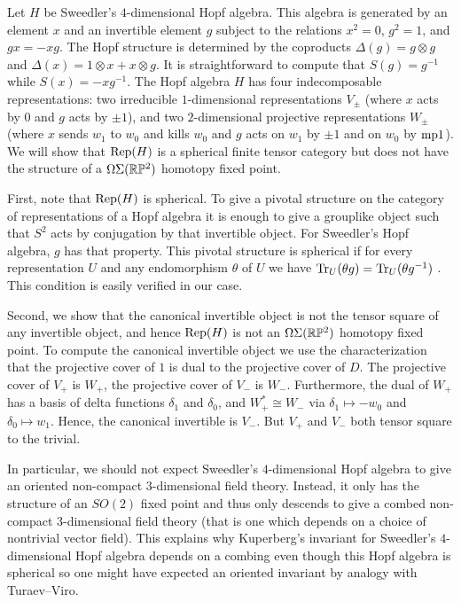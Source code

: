 \documentclass{amsart}
\begin{document}
\begin{example}
Let $H$ be Sweedler's $4$-dimensional Hopf algebra.  This algebra is generated by an element $x$ and an invertible element $g$ subject to the relations $x^2 = 0$, $g^2 = 1$, and $gx = -xg$.  The Hopf structure is determined by the coproducts $\Delta(g) = g \otimes g$ and $\Delta(x) = 1 \otimes x + x \otimes g$.  It is straightforward to compute that $S(g) = g^{-1}$ while $S(x) = - x g^{-1}$.  The Hopf algebra $H$ has four indecomposable representations: two irreducible $1$-dimensional representations $V_{\pm}$ (where $x$ acts by $0$ and $g$ acts by $\pm 1$), and two $2$-dimensional projective representations $W_\pm$ (where $x$ sends $w_1$ to $w_0$ and kills $w_0$ and $g$ acts on $w_1$ by $\pm 1$ and on $w_0$ by $\minusplus 1$). We will show that $\mathrm{Rep}(H)$ is a spherical finite tensor category but does not have the structure of a $\Omega \Sigma (\mathbb R \mathbb P^2)$ homotopy fixed point.

First, note that $\mathrm{Rep}(H)$ is spherical.  To give a pivotal structure on the category of representations of a Hopf algebra it is enough to give a grouplike object such that $S^2$ acts by conjugation by that invertible object.  For Sweedler's Hopf algebra, $g$ has that property.  This pivotal structure is spherical if for every representation $U$ and any endomorphism $\theta$ of $U$ we have $\mathrm{Tr}_U(\theta g) = \mathrm{Tr}_U(\theta g^{-1})$ \cite{MR1686423}.  This condition is easily verified in our case.

Second, we show that the canonical invertible object is not the tensor square of any invertible object, and hence $\mathrm{Rep}(H)$ is not an $\Omega \Sigma (\mathbb R \mathbb P^2)$ homotopy fixed point.  To compute the canonical invertible object we use the characterization that the projective cover of $1$ is dual to the projective cover of $D$.  The projective cover of $V_+$ is $W_+$, the projective cover of $V_-$ is $W_-$.  Furthermore, the dual of $W_+$ has a basis of delta functions $\delta_1$ and $\delta_0$, and $W_+^* \cong W_-$ via $\delta_1 \mapsto -w_0$ and $\delta_0 \mapsto w_1$.  Hence, the canonical invertible is $V_-$.  But $V_+$ and $V_-$ both tensor square to the trivial.
\end{example}

\begin{remark}
In particular, we should not expect Sweedler's $4$-dimensional Hopf algebra to give an oriented non-compact $3$-dimensional field theory.  Instead, it only has the structure of an $SO(2)$ fixed point and thus only descends to give a combed non-compact $3$-dimensional field theory (that is one which depends on a choice of nontrivial vector field).  This explains why Kuperberg's invariant for Sweedler's $4$-dimensional Hopf algebra \cite{MR1394749} depends on a combing even though this Hopf algebra is spherical so one might have expected an oriented invariant by analogy with Turaev--Viro.
\end{remark}
\end{document}
